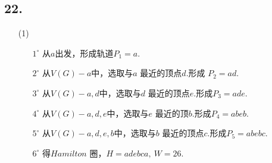 \documentclass{article}
\begin{document}
\subsection*{22.}
\begin{enumerate}
    \item [(1)]
    \begin{enumerate}
        \item [$1^\circ$]从$a$出发，形成轨道$P_1 = a$.
        \item [$2^\circ$]从$V(G) - {a }$中，选取与$a$ 最近的顶点$d$.形成 $P_2=ad$.
        \item [$3^\circ$]从$V(G) - {a ,d }$中，选取与$d$ 最近的顶点$e$.形成$P_3=ade$.
        \item [$4^\circ$]从$V(G) - {a ,d,e }$中，选取与$e$ 最近的顶$b$.形成$P_4=abeb$.
        \item [$5^\circ$]从$V(G) - {a,d,e,b }$中，选取与$b$ 最近的顶点$c$.形成$P_5=abebc$.
        \item [$6^\circ$]得$Hamilton$ 圈，$H = adebca,\ W=26$.
    \end{enumerate}


\end{enumerate}
\end{document}
